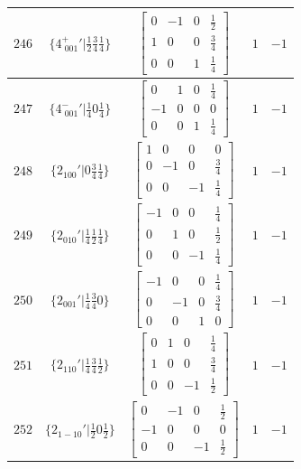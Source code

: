 \documentclass[fleqn,8pt]{jsarticle}
\begin{document}
\begin{longtable}{ccccc}
$ 246 $ & $ \{4^{+}_{\,\,001}{}'|\frac{1}{2} \frac{3}{4} \frac{1}{4}\} $ & $ \begin{bmatrix} 0 & -1 & 0 & \frac{1}{2} \\ 1 & 0 & 0 & \frac{3}{4} \\ 0 & 0 & 1 & \frac{1}{4} \end{bmatrix} $ & $ 1 $ & $ -1 $ \\ \hline
$ 247 $ & $ \{4^{-}_{\,\,001}{}'|\frac{1}{4} 0 \frac{1}{4}\} $ & $ \begin{bmatrix} 0 & 1 & 0 & \frac{1}{4} \\ -1 & 0 & 0 & 0 \\ 0 & 0 & 1 & \frac{1}{4} \end{bmatrix} $ & $ 1 $ & $ -1 $ \\ \hline
$ 248 $ & $ \{2{}_{100}{}'|0 \frac{3}{4} \frac{1}{4}\} $ & $ \begin{bmatrix} 1 & 0 & 0 & 0 \\ 0 & -1 & 0 & \frac{3}{4} \\ 0 & 0 & -1 & \frac{1}{4} \end{bmatrix} $ & $ 1 $ & $ -1 $ \\ \hline
$ 249 $ & $ \{2{}_{010}{}'|\frac{1}{4} \frac{1}{2} \frac{1}{4}\} $ & $ \begin{bmatrix} -1 & 0 & 0 & \frac{1}{4} \\ 0 & 1 & 0 & \frac{1}{2} \\ 0 & 0 & -1 & \frac{1}{4} \end{bmatrix} $ & $ 1 $ & $ -1 $ \\ \hline
$ 250 $ & $ \{2{}_{001}{}'|\frac{1}{4} \frac{3}{4} 0\} $ & $ \begin{bmatrix} -1 & 0 & 0 & \frac{1}{4} \\ 0 & -1 & 0 & \frac{3}{4} \\ 0 & 0 & 1 & 0 \end{bmatrix} $ & $ 1 $ & $ -1 $ \\ \hline
$ 251 $ & $ \{2{}_{110}{}'|\frac{1}{4} \frac{3}{4} \frac{1}{2}\} $ & $ \begin{bmatrix} 0 & 1 & 0 & \frac{1}{4} \\ 1 & 0 & 0 & \frac{3}{4} \\ 0 & 0 & -1 & \frac{1}{2} \end{bmatrix} $ & $ 1 $ & $ -1 $ \\ \hline
$ 252 $ & $ \{2{}_{1-10}{}'|\frac{1}{2} 0 \frac{1}{2}\} $ & $ \begin{bmatrix} 0 & -1 & 0 & \frac{1}{2} \\ -1 & 0 & 0 & 0 \\ 0 & 0 & -1 & \frac{1}{2} \end{bmatrix} $ & $ 1 $ & $ -1 $ \\ \hline

\end{longtable}
\end{document}
